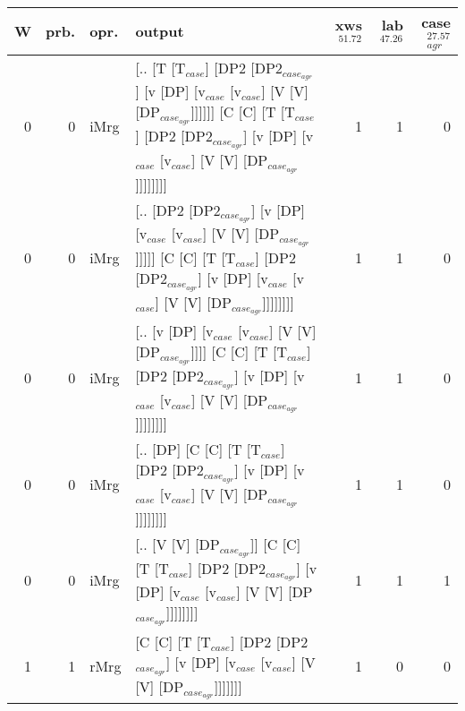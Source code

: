 \begin{tabularx}{\linewidth}{rrlXrrr}
\hline
   W &   prb. & opr.   & output                                                                                                                                                                             &   xws$^{51.72}$ &   lab$^{47.26}$ &   case$_{agr}^{27.57}$ \\
\hline
   0 &   0 & iMrg & [.. [T [T$_{case}$] [DP2 [DP2$_{case_{agr}}$] [v [DP] [v$_{case}$ [v$_{case}$] [V [V] [DP$_{case_{agr}}$]]]]]] [C [C] [T [T$_{case}$] [DP2 [DP2$_{case_{agr}}$] [v [DP] [v$_{case}$ [v$_{case}$] [V [V] [DP$_{case_{agr}}$]]]]]]]] &             1 &             1 &                  0 \\
   0 &   0 & iMrg & [.. [DP2 [DP2$_{case_{agr}}$] [v [DP] [v$_{case}$ [v$_{case}$] [V [V] [DP$_{case_{agr}}$]]]]] [C [C] [T [T$_{case}$] [DP2 [DP2$_{case_{agr}}$] [v [DP] [v$_{case}$ [v$_{case}$] [V [V] [DP$_{case_{agr}}$]]]]]]]]              &             1 &             1 &                  0 \\
   0 &   0 & iMrg & [.. [v [DP] [v$_{case}$ [v$_{case}$] [V [V] [DP$_{case_{agr}}$]]]] [C [C] [T [T$_{case}$] [DP2 [DP2$_{case_{agr}}$] [v [DP] [v$_{case}$ [v$_{case}$] [V [V] [DP$_{case_{agr}}$]]]]]]]]                                   &             1 &             1 &                  0 \\
   0 &   0 & iMrg & [.. [DP] [C [C] [T [T$_{case}$] [DP2 [DP2$_{case_{agr}}$] [v [DP] [v$_{case}$ [v$_{case}$] [V [V] [DP$_{case_{agr}}$]]]]]]]]                                                                               &             1 &             1 &                  0 \\
   0 &   0 & iMrg & [.. [V [V] [DP$_{case_{agr}}$]] [C [C] [T [T$_{case}$] [DP2 [DP2$_{case_{agr}}$] [v [DP] [v$_{case}$ [v$_{case}$] [V [V] [DP$_{case_{agr}}$]]]]]]]]                                                              &             1 &             1 &                  1 \\
   1 &   1 & rMrg & [C [C] [T [T$_{case}$] [DP2 [DP2$_{case_{agr}}$] [v [DP] [v$_{case}$ [v$_{case}$] [V [V] [DP$_{case_{agr}}$]]]]]]]                                                                                         &             1 &             0 &                  0 \\
\hline
\end{tabularx}\endgroup\\
